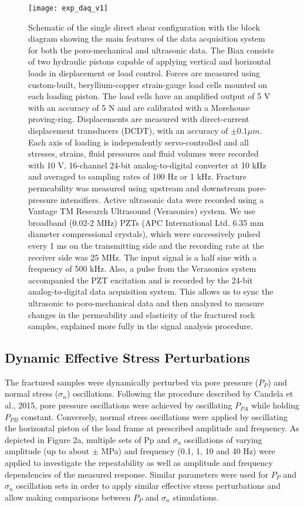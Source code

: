 \documentclass[letterpaper,10pt]{article}
\begin{document}
\begin{figure}[ht]
	\centering
	\texttt{[image: exp\_daq\_v1]}
	\caption[]{Schematic of the single direct shear configuration with the block diagram showing the main features of the data acquisition system for both the poro-mechanical and ultrasonic data. The Biax consists of two hydraulic pistons capable of applying vertical and horizontal loads in displacement or load control. Forces are measured using custom-built, beryllium-copper strain-gauge load cells mounted on each loading piston. The load cells have an amplified output of 5 V with an accuracy of 5 N and are calibrated with a Morehouse proving-ring. Displacements are measured with direct-current displacement transducers (DCDT), with an accuracy of $\pm 0.1 \mu m$. Each axis of loading is independently servo-controlled and all stresses, strains, fluid pressures and fluid volumes were recorded with 10 V, 16-channel 24-bit analog-to-digital converter at 10 kHz and averaged to sampling rates of 100 Hz or 1 kHz. Fracture permeability was measured using upstream and downstream pore-pressure intensifiers. Active ultrasonic data were recorded using a Vantage TM Research Ultrasound (Verasonics) system. We use broadband (0.02-2 MHz) PZTs (APC International Ltd. 6.35 mm diameter compressional crystals), which were successively pulsed every 1 ms on the transmitting side and the recording rate at the receiver side was 25 MHz. The input signal is a half sine with a frequency of 500 kHz. Also, a pulse from the Verasonics system accompanied the PZT excitation and is recorded by the 24-bit analog-to-digital data acquisition system. This allows us to sync the ultrasonic to poro-mechanical data and then analyzed to measure changes in the permeability and elasticity of the fractured rock samples, explained more fully in the signal analysis procedure.}
	\label{fig:data_aq}
\end{figure}

\newpage

\subsection{Dynamic Effective Stress Perturbations}
The fractured samples were dynamically perturbed via pore pressure ($P_P$) and normal stress ($\sigma_{n}$) oscillations. Following the procedure described by Candela et al., 2015, pore pressure oscillations were achieved by oscillating $P_{PA}$ while holding $P_{PB}$ constant. Conversely, normal stress oscillations were
applied by oscillating the horizontal piston of the load frame at prescribed amplitude and frequency. 
As depicted in Figure 2a, multiple sets of Pp and $\sigma_n$ oscillations of varying amplitude (up to about $\pm$ MPa) and frequency (0.1, 1, 10 and 40 Hz) were applied to investigate the repeatability as well as amplitude and frequency dependencies of the measured response. Similar parameters were used for $P_P$ and $\sigma_{n}$ oscillation sets in order to apply similar effective stress perturbations and allow making comparisons between $P_P$ and $\sigma_{n}$ stimulations.
\end{document}
